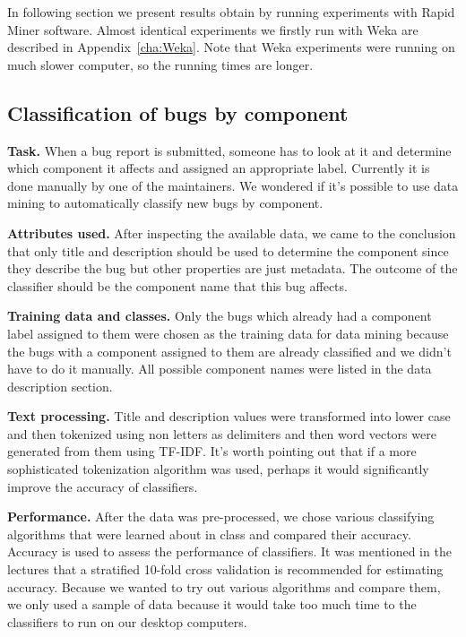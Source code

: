 In following section we present results obtain by running experiments with Rapid Miner software. Almost identical experiments we firstly run with Weka are described in Appendix~\ref{cha:Weka}. Note that Weka experiments were running on much slower computer, so the running times are longer. 

\subsection{Classification of bugs by component} %
\label{sub:Classification of bugs bugs by component}

{\bf Task.} When a bug report is submitted, someone has to look at it and determine which component it affects and assigned an appropriate label. Currently it is done manually by one of the maintainers. We wondered if it's possible to use data mining to automatically classify new bugs by component.

{\bf Attributes used.} After inspecting the available data, we came to the conclusion that only title and description should be used to determine the component since they describe the bug but other properties are just metadata. The outcome of the classifier should be the component name that this bug affects.

{\bf Training data and classes.} Only the bugs which already had a component label assigned to them were chosen as the training data for data mining because the bugs with a component assigned to them are already classified and we didn't have to do it manually. All possible component names were listed in the data description section.

{\bf Text processing.} Title and description values were transformed into lower case and then tokenized using non letters as delimiters and then word vectors were generated from them using TF-IDF. It's worth pointing out that if a more sophisticated tokenization algorithm was used, perhaps it would significantly improve the accuracy of classifiers.

{\bf Performance.} After the data was pre-processed, we chose various classifying algorithms that were learned about in class and compared their accuracy. Accuracy is used to assess the performance of classifiers. It was mentioned in the lectures that a stratified 10-fold cross validation is recommended for estimating accuracy. Because we wanted to try out various algorithms and compare them, we only used a sample of data because it would take too much time to the classifiers to run on our desktop computers.\newline

